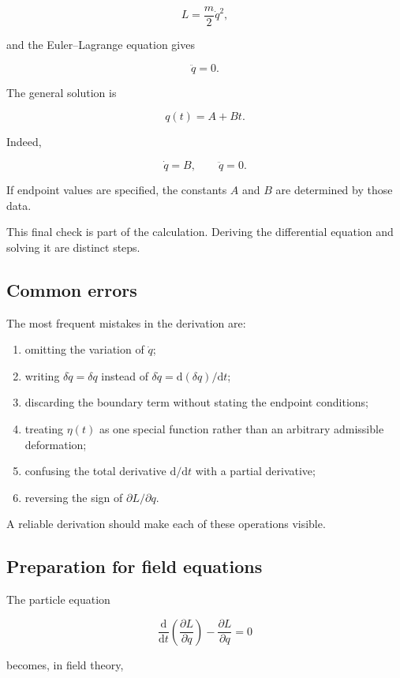 \[
L
=
\frac{m}{2}\dot q^{2},
\]

and the Euler--Lagrange equation gives

\[
\ddot q=0.
\]

The general solution is

\[
q(t)=A+Bt.
\]

Indeed,

\[
\dot q=B,
\qquad
\ddot q=0.
\]

If endpoint values are specified, the constants \(A\) and \(B\) are determined by those data.

This final check is part of the calculation. Deriving the differential equation and solving it are distinct steps.

\subsection{Common errors}

The most frequent mistakes in the derivation are:

\begin{enumerate}
    \item omitting the variation of \(\dot q\);
    \item writing \(\delta\dot q=\delta q\) instead of \(\delta\dot q=\mathrm{d}(\delta q)/\mathrm{d}t\);
    \item discarding the boundary term without stating the endpoint conditions;
    \item treating \(\eta(t)\) as one special function rather than an arbitrary admissible deformation;
    \item confusing the total derivative \(\mathrm{d}/\mathrm{d}t\) with a partial derivative;
    \item reversing the sign of \(\partial L/\partial q\).
\end{enumerate}

A reliable derivation should make each of these operations visible.

\subsection{Preparation for field equations}

The particle equation

\[
\frac{\mathrm{d}}{\mathrm{d}t}
\left(
\frac{\partial L}{\partial\dot q}
\right)
-
\frac{\partial L}{\partial q}
=0
\]

becomes, in field theory,

